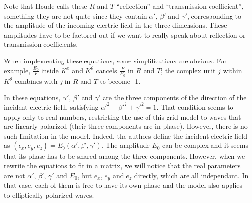 Note that Houde calls these $R$ and $T$ ``reflection'' and ``transmission coefficient'', something they are not quite since they contain $\alpha'$, $\beta'$ and $\gamma'$, corresponding to the amplitude of the incoming electric field in the three dimensions.
These amplitudes have to be factored out if we want to really speak about reflection or transmission coefficients.

When implementing these equations, some simplifications are obvious.
For example, $\frac{E_0}{F}$ inside $K^x$ and $K^\theta$ cancels $\frac{F}{E_0}$ in $R$ and $T$;
the complex unit $j$ within $K^\theta$ combines with $j$ in $R$ and $T$ to become -1.

In these equations, $\alpha'$, $\beta'$ and $\gamma'$ are the three components of the direction of the incident electric field, satisfying $\alpha'^2 + \beta'^2 + \gamma'^2 = 1$.
That condition seems to apply only to real numbers, restricting the use of this grid model to waves that are linearly polarized (their three components are in phase).
However, there is no such limitation in the model.
Indeed, the authors define the incident electric field as $(e_x, e_y, e_z) = E_0(\alpha', \beta', \gamma')$.
The amplitude $E_0$ can be complex and it seems that its phase has to be shared among the three components.
However, when we rewrite the equations to fit in a matrix, we will notice that the real parameters are not $\alpha'$, $\beta'$, $\gamma'$ and $E_0$, but $e_x$, $e_y$ and $e_z$ directly, which are all independant.
In that case, each of them is free to have its own phase and the model also applies to elliptically polarized waves.



